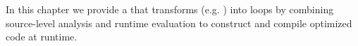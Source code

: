 \chapter{\Algorithm}
In this chapter we provide a \javascript \algorithm that transforms \pipelines (e.g. ) into  loops by combining source-level analysis and runtime evaluation to construct and compile optimized code at runtime.  






